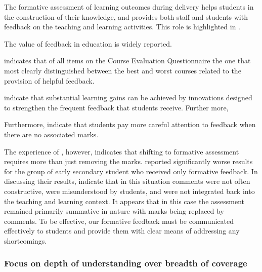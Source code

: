 The formative assessment of learning outcomes during delivery helps students in the construction of their knowledge, and provides both staff and students with feedback on the teaching and learning activities. This role is highlighted in .

The value of feedback in education is widely reported. 


\citet{Ramsden:1992} indicates that of all items on the Course Evaluation Questionnaire \cite{Ramsden:1991} the one that most clearly distinguished between the best and worst courses related to the provision of helpful feedback.



\citet{Black:1998} indicate that substantial learning gains can be achieved by innovations designed to strengthen the frequent feedback that students receive. Further more, 


Furthermore, \citet{Black:1998} indicate that students pay more careful attention to feedback when there are no associated marks.




The experience of \citet{Smith:2005}, however, indicates that shifting to formative assessment requires more than just removing the marks. \citet{Smith:2005} reported significantly worse results for the group of early secondary student who received only formative feedback. In discussing their results, \citet{Smith:2005} indicate that in this situation comments were not often constructive, were misunderstood by students, and were not integrated back into the teaching and learning context. It appears that in this case the assessment remained primarily summative in nature with marks being replaced by comments. To be effective, our formative feedback must be communicated effectively to students and provide them with clear means of addressing any shortcomings.





\subsubsection{Focus on depth of understanding over breadth of coverage} %
\label{ssub:focus_on_depth_of_understanding_over_breadth_of_coverage_}


